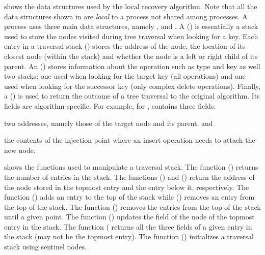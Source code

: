  shows the data structures used by the local recovery algorithm.
Note that all the data structures shown in  are \emph{local} to a process not shared among processes.
A process uses three main data structures, namely \TraversalRecord{}, \OpRecord{} and \SeekRecord{}. 
A \TraversalRecord{} () is essentially a stack used to store the nodes visited during tree traversal when looking for a key.
Each entry in a traversal stack () stores the address of the node, the location of its closest \myanchor{} node (within the stack) and whether the node is a left or right child of its parent.
An \OpRecord{} () stores information about the operation such as type and key as well two stacks: one used when looking for the target key (all operations) and one used when looking for the successor key (only complex delete operations).
Finally, a \SeekRecord{} () is used to return the outcome of a tree traversal to the original algorithm.
Its fields are algorithm-specific. 
For example, for \CASTLE{}, \SeekRecord{} contains three fields: 
\begin{enumerate*}[label=(\alph*)]
\item two addresses, namely those of the target node and its parent, and
\item the contents of the injection point where an insert operation needs to attach the new node. 
\end{enumerate*}

 shows the functions used to manipulate a traversal stack. 
The function \Size{} () returns the number of entries in the stack. 
The functions \GetTop{} () and \GetSecondToTop{} () return the address of the node stored in the topmost entry and the entry below it, respectively. 
The function \AddToTop{} () adds an entry to the top of the stack while \RemoveFromTop{} () removes an entry from the top of the stack. 
The function \RemoveUntilCritical{} () removes the entries from the top of the stack until a given point.
The function \RememberCritical{} () updates the \myanchor{} field of the \myanchor{} node of the topmost entry in the stack.
The function \GetFullEntry{} ( returns all the three fields of a given entry in the stack (may not be the topmost entry). 
The function \InitializeTraversalRecord{} () initializes a traversal stack using sentinel nodes.

